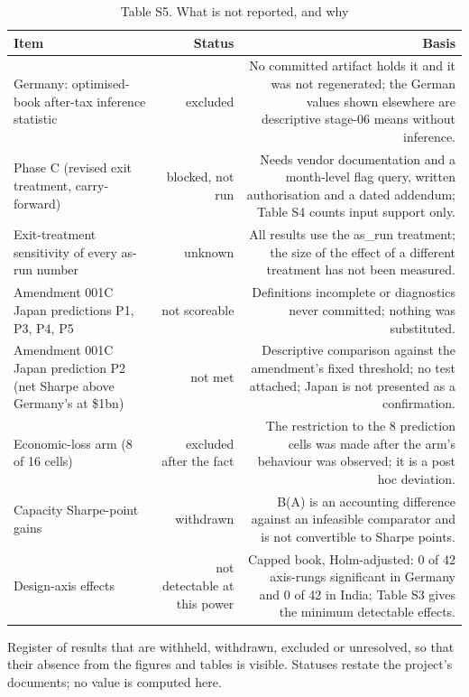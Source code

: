 \begin{table}[t]
\centering
\small
\caption{Table S5. What is not reported, and why}
\label{tab:s5}
\begin{tabular}{lrr}
\toprule
Item & Status & Basis \\
\midrule
Germany: optimised-book after-tax inference statistic & excluded & No committed artifact holds it and it was not regenerated; the German values shown elsewhere are descriptive stage-06 means without inference. \\
Phase C (revised exit treatment, carry-forward) & blocked, not run & Needs vendor documentation and a month-level flag query, written authorisation and a dated addendum; Table S4 counts input support only. \\
Exit-treatment sensitivity of every as-run number & unknown & All results use the as\_run treatment; the size of the effect of a different treatment has not been measured. \\
Amendment 001C Japan predictions P1, P3, P4, P5 & not scoreable & Definitions incomplete or diagnostics never committed; nothing was substituted. \\
Amendment 001C Japan prediction P2 (net Sharpe above Germany's at \$1bn) & not met & Descriptive comparison against the amendment's fixed threshold; no test attached; Japan is not presented as a confirmation. \\
Economic-loss arm (8 of 16 cells) & excluded after the fact & The restriction to the 8 prediction cells was made after the arm's behaviour was observed; it is a post hoc deviation. \\
Capacity Sharpe-point gains & withdrawn & B(A) is an accounting difference against an infeasible comparator and is not convertible to Sharpe points. \\
Design-axis effects & not detectable at this power & Capped book, Holm-adjusted: 0 of 42 axis-rungs significant in Germany and 0 of 42 in India; Table S3 gives the minimum detectable effects. \\
\bottomrule
\end{tabular}
\par\vspace{2pt}
\parbox{\textwidth}{\footnotesize Register of results that are withheld, withdrawn, excluded or unresolved, so that their absence from the figures and tables is visible. Statuses restate the project's documents; no value is computed here.}
\end{table}
